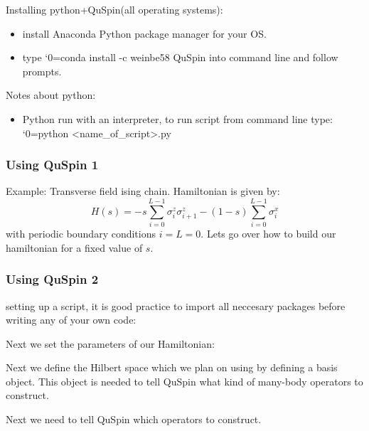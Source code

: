 \documentclass{beamer}
\newcommand\0{\scalebox{-1}[1]{0}}
\let\svttfamily\ttfamily
\renewcommand\ttfamily{\svttfamily\catcode`0=\active }
\renewcommand\texttt{\bgroup\ttfamily\texttthelp}
\def\texttthelp#1{#1\egroup}
\newcommand{\pz}{\sigma^z}
\newcommand{\px}{\sigma^x}
\newcommand{\intro}{QuSpin_intro.py}
\begin{document}
\begin{frame}
Installing python+QuSpin(all operating systems):
\begin{itemize}
\item install Anaconda Python package manager for your OS. 
\item type \texttt{conda install -c weinbe58 QuSpin} into command line and follow prompts. 
\end{itemize}

Notes about python:
\begin{itemize}
\item Python run with an interpreter, to run script from command line type: \texttt{python <name\_of\_script>.py}
\end{itemize}
\end{frame}
\begin{frame}
\frametitle{Using QuSpin 1}
Example: Transverse field ising chain. Hamiltonian is given by:
\begin{equation*}
H(s) = -s\sum_{i=0}^{L-1} \pz_i\pz_{i+1} - (1-s)\sum_{i=0}^{L-1}\px_i
\end{equation*}
with periodic boundary conditions $i=L=0$. Lets go over how to build our hamiltonian for a fixed value of $s$.

\end{frame}

\begin{frame}[t]
\frametitle{Using QuSpin 2}
setting up a script, it is good practice to import all neccesary packages before writing any of your own code:

Next we set the parameters of our Hamiltonian:

Next we define the Hilbert space which we plan on using by defining a basis object. This object is needed to tell QuSpin what kind of many-body operators to construct.

Next we need to tell QuSpin which operators to construct. 

\end{frame}
\end{document}
